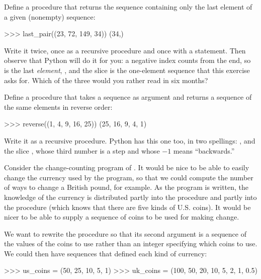 \begin{exerciseGroup}
\label{Exercise 2.17}
 Define a procedure
 that returns the sequence containing only the last element of
a given (nonempty) sequence:

\begin{codeBlock}
>>> last_pair((23, 72, 149, 34))
(34,)
\end{codeBlock}

Write it twice, once as a recursive procedure and once with a 
statement.  Then observe that Python will do it for you: a negative index
counts from the end, so  is the last \emph{element}, ,
and the slice  is the one-element sequence  that
this exercise asks for.  Which of the three would you rather read in six
months?

\label{Exercise 2.18}
 Define a procedure 
that takes a sequence as argument and returns a sequence of the same elements
in reverse order:

\begin{codeBlock}
>>> reverse((1, 4, 9, 16, 25))
(25, 16, 9, 4, 1)
\end{codeBlock}

Write it as a recursive procedure.  Python has this one too, in two spellings:
, and the slice , whose third
number is a step and whose \( -1 \) means ``backwards.''

\label{Exercise 2.19}
 Consider the change-counting
program of .  It would be nice to be able to easily change
the currency used by the program, so that we could compute the number of ways
to change a British pound, for example.  As the program is written, the
knowledge of the currency is distributed partly into the procedure
 and partly into the procedure 
(which knows that there are five kinds of U.S. coins).  It would be nicer to be
able to supply a sequence of coins to be used for making change.

We want to rewrite the procedure  so that its second argument is a
sequence of the values of the coins to use rather than an integer specifying
which coins to use.  We could then have sequences that defined each kind of
currency:

\begin{codeBlock}
>>> us_coins = (50, 25, 10, 5, 1)
>>> uk_coins = (100, 50, 20, 10, 5, 2, 1, 0.5)
\end{codeBlock}


\end{exerciseGroup}
